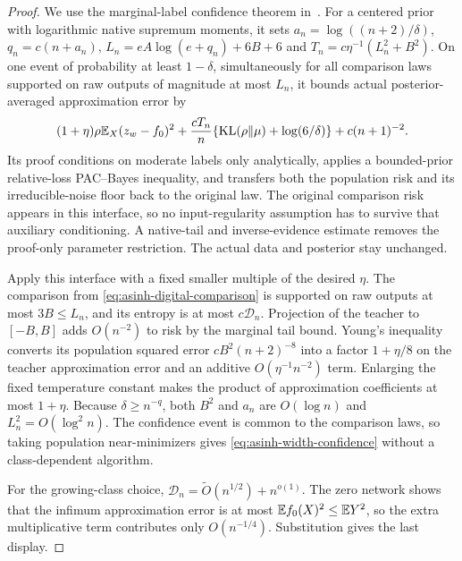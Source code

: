 \begin{proof}
We use the marginal-label confidence theorem in~\cite{rawprior}.
For a centered prior with logarithmic native supremum moments, it sets
$a_n=\log((n+2)/\delta)$, $q_n=c(n+a_n)$,
$L_n=eA\log(e+q_n)+6B+6$ and
$T_n=c\eta^{-1}(L_n^2+B^2)$.
On one event of probability at least $1-\delta$, simultaneously for
all comparison laws supported on raw outputs of magnitude at most
$L_n$, it bounds actual posterior-averaged approximation error by
\[
 (1+\eta)\rho\mathbb E_X(z_w-f_0)^2+
       \frac{cT_n}{n}\{\operatorname{KL}(\rho\|\mu)+\log(6/\delta)\}
       +c(n+1)^{-2}.
\]
Its proof conditions on moderate labels only analytically, applies a
bounded-prior relative-loss PAC--Bayes inequality, and transfers both
the population risk and its irreducible-noise floor back to the original
law.  The original comparison risk appears in this interface, so no
input-regularity assumption has to survive that auxiliary conditioning.
A native-tail and inverse-evidence estimate removes the proof-only
parameter restriction.  The actual data and posterior stay unchanged.

Apply this interface with a fixed smaller multiple of the desired
$\eta$.  The comparison from \eqref{eq:asinh-digital-comparison} is
supported on raw outputs at most $3B\le L_n$, and its entropy is at
most $c\mathcal D_n$.  Projection of the teacher to $[-B,B]$ adds
$O(n^{-2})$ to risk by the marginal tail bound.  Young's inequality
converts its population squared error $cB^2(n+2)^{-8}$ into a factor
$1+\eta/8$ on the teacher approximation error and an additive
$O(\eta^{-1}n^{-2})$ term.  Enlarging the fixed temperature constant
makes the product of approximation coefficients at most $1+\eta$.
Because $\delta\ge n^{-q}$, both $B^2$ and $a_n$ are $O(\log n)$
and $L_n^2=O(\log^2 n)$.  The confidence event is common to the
comparison laws, so taking population near-minimizers gives
\eqref{eq:asinh-width-confidence} without a class-dependent algorithm.

For the growing-class choice,
$\mathcal D_n=\widetilde O(n^{1/2})+n^{o(1)}$.
The zero network shows that the infimum approximation error is at most
$\mathbb E f_0(X)^2\le\mathbb E Y^2$, so the extra multiplicative term contributes
only $O(n^{-1/4})$.  Substitution gives the last display.
\end{proof}

